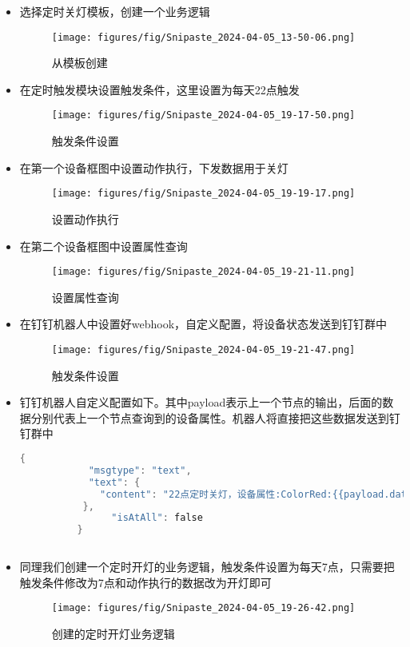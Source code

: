 \documentclass[12pt,hyperref,a4paper,UTF8]{ctexart}
\begin{document}
\begin{itemize}[itemsep=-5pt, topsep=0pt, partopsep=0pt]
    \item 选择定时关灯模板，创建一个业务逻辑
    \begin{figure}[H]
        \centering
        \texttt{[image: figures/fig/Snipaste\_2024-04-05\_13-50-06.png]}
        \caption{从模板创建}
        \label{fig:enter-label}
    \end{figure}
    \item 在定时触发模块设置触发条件，这里设置为每天22点触发
    \begin{figure}[H]
        \centering
        \texttt{[image: figures/fig/Snipaste\_2024-04-05\_19-17-50.png]}
        \caption{触发条件设置}
        \label{fig:enter-label}
    \end{figure}
    \item 在第一个设备框图中设置动作执行，下发数据用于关灯
    \begin{figure}[H]
        \centering
        \texttt{[image: figures/fig/Snipaste\_2024-04-05\_19-19-17.png]}
        \caption{设置动作执行}
        \label{fig:enter-label}
    \end{figure}
    \item 在第二个设备框图中设置属性查询
    \begin{figure}[H]
        \centering
        \texttt{[image: figures/fig/Snipaste\_2024-04-05\_19-21-11.png]}
        \caption{设置属性查询}
        \label{fig:enter-label}
    \end{figure}
    \item 在钉钉机器人中设置好webhook，自定义配置，将设备状态发送到钉钉群中
    \begin{figure}[H]
        \centering
        \texttt{[image: figures/fig/Snipaste\_2024-04-05\_19-21-47.png]}
        \caption{触发条件设置}
        \label{fig:enter-label}
    \end{figure}
    \item 钉钉机器人自定义配置如下。其中payload表示上一个节点的输出，后面的数据分别代表上一个节点查询到的设备属性。机器人将直接把这些数据发送到钉钉群中
    \begin{lstlisting}[language={C}]
        {
            "msgtype": "text", 
            "text": {
              "content": "22点定时关灯，设备属性:ColorRed:{{payload.data[0].value}};ColorBlue:{{payload.data[1].value}};ColorGreen:{{payload.data[2].value}};Lightswitch:{{payload.data[3].value}};Temperature:{{payload.data[5].value}}"
           }, 
                "isAtAll": false
          }
        
    \end{lstlisting}

    \item 同理我们创建一个定时开灯的业务逻辑，触发条件设置为每天7点，只需要把触发条件修改为7点和动作执行的数据改为开灯即可
    \begin{figure}[H]
        \centering
        \texttt{[image: figures/fig/Snipaste\_2024-04-05\_19-26-42.png]}
        \caption{创建的定时开灯业务逻辑}
        \label{fig:enter-label}
    \end{figure}

\end{itemize}
\end{document}
